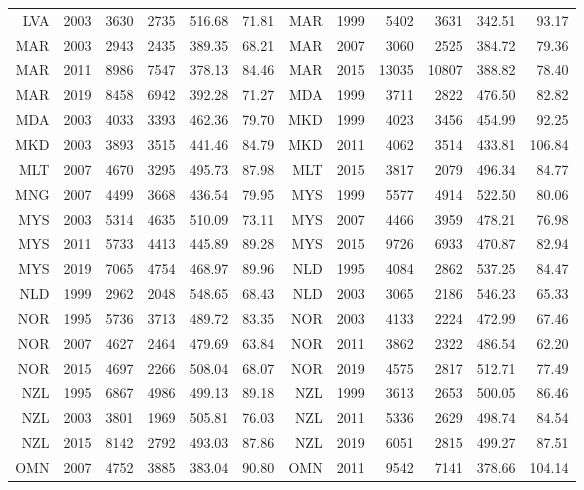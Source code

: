 {\begin{longtable}{r|r|r|r|r|r||r|r|r|r|r|r}
    LVA   & 2003  & 3630  & 2735  & 516.68 & 71.81  & MAR   & 1999  & 5402  & 3631  & 342.51 & 93.17 \\
    MAR   & 2003  & 2943  & 2435  & 389.35 & 68.21  & MAR   & 2007  & 3060  & 2525  & 384.72 & 79.36 \\
    MAR   & 2011  & 8986  & 7547  & 378.13 & 84.46  & MAR   & 2015  & 13035 & 10807 & 388.82 & 78.40 \\
    MAR   & 2019  & 8458  & 6942  & 392.28 & 71.27  & MDA   & 1999  & 3711  & 2822  & 476.50 & 82.82 \\
    MDA   & 2003  & 4033  & 3393  & 462.36 & 79.70  & MKD   & 1999  & 4023  & 3456  & 454.99 & 92.25 \\
    MKD   & 2003  & 3893  & 3515  & 441.46 & 84.79  & MKD   & 2011  & 4062  & 3514  & 433.81 & 106.84 \\
    MLT   & 2007  & 4670  & 3295  & 495.73 & 87.98  & MLT   & 2015  & 3817  & 2079  & 496.34 & 84.77 \\
    MNG   & 2007  & 4499  & 3668  & 436.54 & 79.95  & MYS   & 1999  & 5577  & 4914  & 522.50 & 80.06 \\
    MYS   & 2003  & 5314  & 4635  & 510.09 & 73.11  & MYS   & 2007  & 4466  & 3959  & 478.21 & 76.98 \\
    MYS   & 2011  & 5733  & 4413  & 445.89 & 89.28  & MYS   & 2015  & 9726  & 6933  & 470.87 & 82.94 \\
    MYS   & 2019  & 7065  & 4754  & 468.97 & 89.96  & NLD   & 1995  & 4084  & 2862  & 537.25 & 84.47 \\
    NLD   & 1999  & 2962  & 2048  & 548.65 & 68.43  & NLD   & 2003  & 3065  & 2186  & 546.23 & 65.33 \\
    NOR   & 1995  & 5736  & 3713  & 489.72 & 83.35  & NOR   & 2003  & 4133  & 2224  & 472.99 & 67.46 \\
    NOR   & 2007  & 4627  & 2464  & 479.69 & 63.84  & NOR   & 2011  & 3862  & 2322  & 486.54 & 62.20 \\
    NOR   & 2015  & 4697  & 2266  & 508.04 & 68.07  & NOR   & 2019  & 4575  & 2817  & 512.71 & 77.49 \\
    NZL   & 1995  & 6867  & 4986  & 499.13 & 89.18  & NZL   & 1999  & 3613  & 2653  & 500.05 & 86.46 \\
    NZL   & 2003  & 3801  & 1969  & 505.81 & 76.03  & NZL   & 2011  & 5336  & 2629  & 498.74 & 84.54 \\
    NZL   & 2015  & 8142  & 2792  & 493.03 & 87.86  & NZL   & 2019  & 6051  & 2815  & 499.27 & 87.51 \\
    OMN   & 2007  & 4752  & 3885  & 383.04 & 90.80  & OMN   & 2011  & 9542  & 7141  & 378.66 & 104.14 \\

\end{longtable}}
